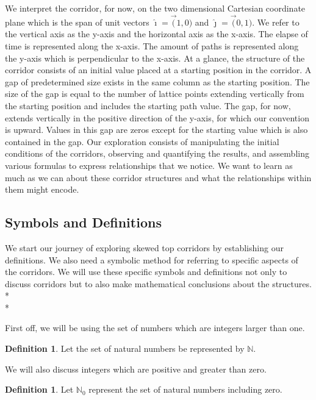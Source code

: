 \documentclass{article}
\newcommand\tab[1][1cm]{\hspace*{#1}}
\newcommand*{\set}[1]{\mathbb{#1}}
\theoremstyle{definition}
\newtheorem{defn}[thm]{Definition}
\begin{document}
  \tab We interpret the corridor, for now, on the two dimensional Cartesian coordinate plane which is the span of unit  
  vectors $\hat{\imath} = \vec(1, 0)$ and $\hat{\jmath} = \vec(0, 1)$. 
  We refer to the vertical axis as the y-axis and the horizontal axis as the x-axis.
  The elapse of time is represented along the x-axis. 
  The amount of paths is represented along the y-axis which is perpendicular to the x-axis. At a glance, the structure 
  of the corridor consists of an initial value placed at a starting position in the corridor. A gap of predetermined size 
  exists in the same column as the starting position. The size of the gap is equal to the number of lattice points extending    
  vertically from the starting position and includes the starting path value. The gap, for now, extends vertically in the   
  positive direction of the y-axis, for which our convention is upward. Values in this gap are zeros except for the starting 
  value which is also contained in the gap. Our exploration consists of manipulating the initial conditions of the corridors, 
  observing and quantifying the results, and assembling various formulas to express relationships that we notice. We want to 
  learn as much as we can about these corridor structures and what the relationships within them might encode.\par
  
  \subsection*{Symbols and Definitions}
  \tab We start our journey of exploring skewed top corridors by establishing our definitions. We also need a symbolic method 
  for referring to specific aspects of the corridors. We will use these specific symbols and definitions not only to discuss 
  corridors but to also make mathematical conclusions about the structures.\\*\\*
  
  \noindent First off, we will be using the set of numbers which are integers larger than one.
  \begin{defn} Let the set of natural numbers be represented by $\set{N}$.\\ \end{defn}\par
  
  \noindent We will also discuss integers which are positive and greater than zero. 
  \begin{defn} Let $\set{N}_0$ represent the set of natural numbers including zero. \end{defn}
  
\end{document}
